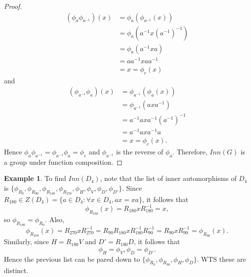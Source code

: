 \documentclass{article}
\theoremstyle{definition}
\newtheorem{example}{Example}[section]
\begin{document}
\begin{proof}
\begin{align*}
         (\phi_a\phi_{a^{-1}})(x) &= \phi_a(\phi_{a^{-1}}(x)) \\ 
         &= \phi_a(a^{-1}x(a^{-1})^{-1}) \\
         &= \phi_a(a^{-1}xa) \\
         &= aa^{-1}xaa^{-1} \\
         &= x = \phi_e(x)
     \end{align*}
     and
     \begin{align*}
         (\phi_{a^{-1}}\phi_a)(x) &= \phi_{a^{-1}}(\phi_a(x)) \\
         &= \phi_{a^{-1}}(axa^{-1}) \\
         &= a^{-1}axa^{-1}(a^{-1})^{-1} \\
         &= a^{-1}axa^{-1}a \\
         &= x = \phi_e(x).
     \end{align*}
     Hence $\phi_a\phi_{a^{-1}} = \phi_{a^{-1}}\phi_a = \phi_e$ and $\phi_{a^{-1}}$ is the reverse of $\phi_a$. Therefore, $Inn(G)$ is a group under function composition.
 \end{proof}
 
 \begin{example}
     To find $Inn(D_4)$, note that the list of inner automorphisms of $D_4$ is $\{\phi_{R_0}, \phi_{R_{90}}, \phi_{R_{180}}, \phi_{R_{270}}, \phi_H, \phi_V, \phi_D, \phi_{D'}\}$. Since $R_{180} \in Z(D_4) = \{a \in D_4: \forall x \in D_4, ax = xa\}$, it follows that
     \begin{equation*}
         \phi_{R_{180}}(x) = R_{180}xR_{180}^{-1} = x,
     \end{equation*}
     so $\phi_{R_{180}} = \phi_{R_0}$. Also,
     \begin{equation*}
         \phi_{R_{270}}(x) =  R_{270}xR_{270}^{-1} = R_{90}R_{180}xR_{180}^{-1}R_{90}^{-1} = R_{90}xR_{90}^{-1} = \phi_{R_{90}}(x).
     \end{equation*}
     Similarly, since $H=R_{180}V$ and $D'=R_{180}D$, it follows that
     \begin{equation*}
         \phi_H = \phi_V, \phi_D = \phi_{D'}.
     \end{equation*}
     Hence the previous list can be pared down to $\{\phi_{R_0}, \phi_{R_{90}}, \phi_H, \phi_D\}$. WTS these are distinct.
 \end{example}
 
\end{document}
